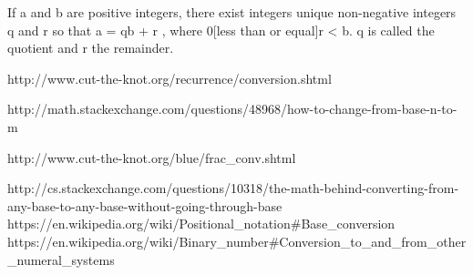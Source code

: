 If a and b are positive integers, there exist integers unique non-negative integers q and r so that
a = qb + r , where 0[less than or equal]r < b.
q is called the quotient and r the remainder.


http://www.cut-the-knot.org/recurrence/conversion.shtml

http://math.stackexchange.com/questions/48968/how-to-change-from-base-n-to-m

http://www.cut-the-knot.org/blue/frac_conv.shtml

http://cs.stackexchange.com/questions/10318/the-math-behind-converting-from-any-base-to-any-base-without-going-through-base
https://en.wikipedia.org/wiki/Positional_notation#Base_conversion
https://en.wikipedia.org/wiki/Binary_number#Conversion_to_and_from_other_numeral_systems

